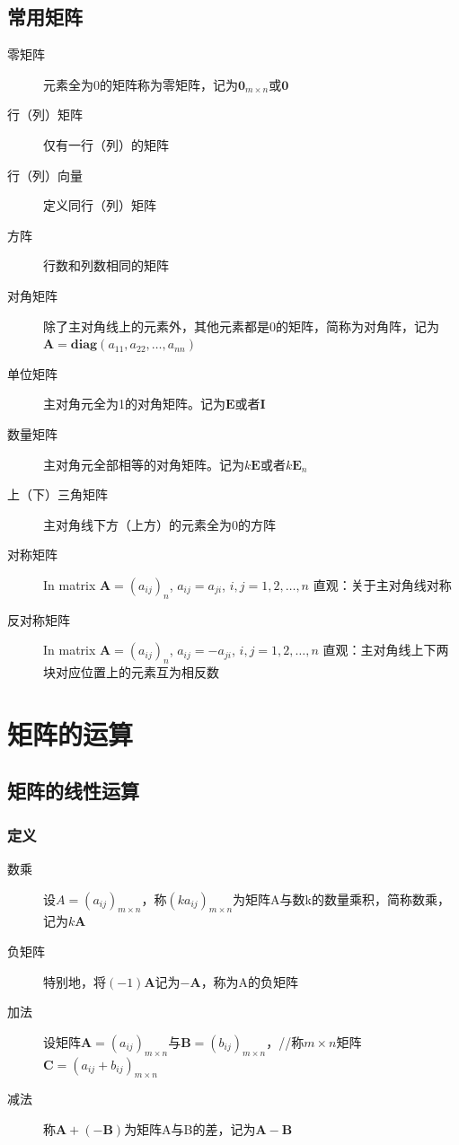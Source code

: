 \documentclass[12pt,oneside]{ctexbook}
\begin{document}
\section{常用矩阵}
\begin{description}
    \item[零矩阵]{\kaishu 元素全为0的矩阵称为零矩阵，记为\(\mathbf 0_{m\times n}\)或\(\mathbf 0\)}
    \item[行（列）矩阵] {\kaishu 仅有一行（列）的矩阵}
    \item[行（列）向量]{\kaishu 定义同行（列）矩阵} 
    \item[方阵] \kaishu 行数和列数相同的矩阵
    \item[对角矩阵] \kaishu 除了主对角线上的元素外，其他元素都是0的矩阵，简称为对角阵，记为\(\mathbf A = \mathbf{diag}(a_{11},a_{22},\dots ,a_{nn})\)
    \item[单位矩阵] \kaishu 主对角元全为1的对角矩阵。记为\(\mathbf{E}\)或者\(\mathbf{I}\)
    \item[数量矩阵] \kaishu 主对角元全部相等的对角矩阵。记为\( k \mathbf E \)或者\(k\mathbf E_n\)
    \item[上（下）三角矩阵] \kaishu 主对角线下方（上方）的元素全为0的方阵
    \item[对称矩阵] In matrix \(\mathbf{A}=(a_{ij})_n\), \(a_{ij}=a_{ji}\), \(i,j=1,2,\dots ,n\) \newline \kaishu 直观：关于主对角线对称
    \item[反对称矩阵] In matrix \(\mathbf{A}=(a_{ij})_n\), \(a_{ij}=-a_{ji}\), \(i,j=1,2,\dots ,n\) \newline \kaishu 直观：主对角线上下两块对应位置上的元素互为相反数
\end{description}

\chapter{矩阵的运算}
\section{矩阵的线性运算}
\subsection{定义}
\begin{description}
    \item[数乘] 设\(A=(a_{ij})_{m\times n}\)，称\((ka_{ij})_{m\times n}\)为矩阵A与数k的数量乘积，简称数乘，记为\(k\mathbf{A}\)
    \item[负矩阵] 特别地，将\((-1)\mathbf{A}\)记为\(-\mathbf{A}\)，称为A的负矩阵
    \item[加法] 设矩阵\(\mathbf{A}=(a_{ij})_{m\times n}\)与\(\mathbf{B}=(b_{ij})_{m\times n}\)，//称\(m\times n\)矩阵\(\mathbf{C}=(a_{ij}+b_{ij})_{m\times n}\)
    \item[减法] 称\(\mathbf{A}+(\mathbf{-B})\)为矩阵A与B的差，记为\(\mathbf{A}-\mathbf{B}\)
\end{description}
\end{document}
